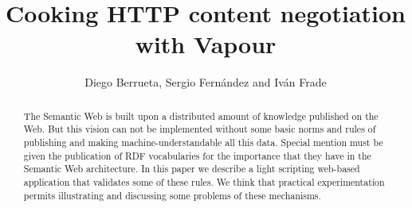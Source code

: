 \documentclass{../templates/llncs}
\begin{document}

\title{Cooking HTTP content negotiation with Vapour}



\author{Diego Berrueta, Sergio Fern\'andez and Iv\'an Frade}


\maketitle

\begin{abstract}
The Semantic Web is built upon a distributed amount of knowledge published on 
the Web. But this vision can not be implemented without some basic norms and 
rules of publishing and making machine-understandable all this data. Special 
mention must be given the publication of RDF vocabularies for the importance that
they have in the Semantic Web architecture. In this paper we describe a light 
scripting web-based application that validates some of these rules. We think 
that practical experimentation permits illustrating and discussing some
problems of these mechanisms.
\end{abstract}




\end{document}
